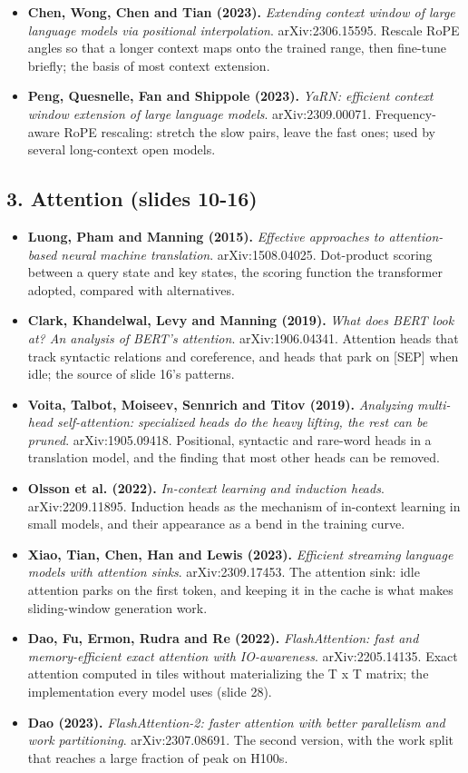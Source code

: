 \documentclass[11pt,letterpaper]{article}
\begin{document}
\begin{itemize}[leftmargin=1.2em,itemsep=3pt]
\item \textbf{Chen, Wong, Chen and Tian (2023).} \textit{Extending context window of large language models via positional interpolation}. arXiv:2306.15595. Rescale RoPE angles so that a longer context maps onto the trained range, then fine-tune briefly; the basis of most context extension.
\item \textbf{Peng, Quesnelle, Fan and Shippole (2023).} \textit{YaRN: efficient context window extension of large language models}. arXiv:2309.00071. Frequency-aware RoPE rescaling: stretch the slow pairs, leave the fast ones; used by several long-context open models.
\end{itemize}
\subsection*{3. Attention (slides 10-16)}
\begin{itemize}[leftmargin=1.2em,itemsep=3pt]\sloppy
\item \textbf{Luong, Pham and Manning (2015).} \textit{Effective approaches to attention-based neural machine translation}. arXiv:1508.04025. Dot-product scoring between a query state and key states, the scoring function the transformer adopted, compared with alternatives.
\item \textbf{Clark, Khandelwal, Levy and Manning (2019).} \textit{What does BERT look at? An analysis of BERT's attention}. arXiv:1906.04341. Attention heads that track syntactic relations and coreference, and heads that park on [SEP] when idle; the source of slide 16's patterns.
\item \textbf{Voita, Talbot, Moiseev, Sennrich and Titov (2019).} \textit{Analyzing multi-head self-attention: specialized heads do the heavy lifting, the rest can be pruned}. arXiv:1905.09418. Positional, syntactic and rare-word heads in a translation model, and the finding that most other heads can be removed.
\item \textbf{Olsson et al. (2022).} \textit{In-context learning and induction heads}. arXiv:2209.11895. Induction heads as the mechanism of in-context learning in small models, and their appearance as a bend in the training curve.
\item \textbf{Xiao, Tian, Chen, Han and Lewis (2023).} \textit{Efficient streaming language models with attention sinks}. arXiv:2309.17453. The attention sink: idle attention parks on the first token, and keeping it in the cache is what makes sliding-window generation work.
\item \textbf{Dao, Fu, Ermon, Rudra and Re (2022).} \textit{FlashAttention: fast and memory-efficient exact attention with IO-awareness}. arXiv:2205.14135. Exact attention computed in tiles without materializing the T x T matrix; the implementation every model uses (slide 28).
\item \textbf{Dao (2023).} \textit{FlashAttention-2: faster attention with better parallelism and work partitioning}. arXiv:2307.08691. The second version, with the work split that reaches a large fraction of peak on H100s.
\end{itemize}
\end{document}
